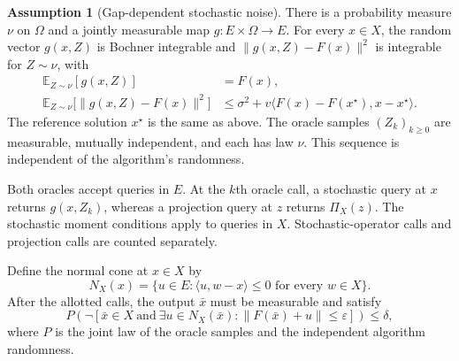 \documentclass[10pt]{article}
\theoremstyle{definition}
\newtheorem{assumption}{Assumption}
\begin{document}
\begin{assumption}[Gap-dependent stochastic noise]
There is a probability measure $\nu$ on $\Omega$ and a jointly measurable map $g:E\times\Omega\to E$. For every $x\in X$, the random vector $g(x,Z)$ is Bochner integrable and $\|g(x,Z)-F(x)\|^2$ is integrable for $Z\sim\nu$, with
\[
\begin{aligned}
\mathbb{E}_{Z\sim\nu}[g(x,Z)]&=F(x),\\
\mathbb{E}_{Z\sim\nu}\bigl[\|g(x,Z)-F(x)\|^2\bigr]
&\leq \sigma^2+v\langle F(x)-F(x^\star),x-x^\star\rangle.
\end{aligned}
\]
The reference solution $x^\star$ is the same as above. The oracle samples $(Z_k)_{k\geq0}$ are measurable, mutually independent, and each has law $\nu$. This sequence is independent of the algorithm's randomness.
\end{assumption}

Both oracles accept queries in $E$. At the $k$th oracle call, a stochastic query at $x$ returns $g(x,Z_k)$, whereas a projection query at $z$ returns $\Pi_X(z)$. The stochastic moment conditions apply to queries in $X$. Stochastic-operator calls and projection calls are counted separately.

Define the normal cone at $x\in X$ by
\[
N_X(x)=\{u\in E:\langle u,w-x\rangle\leq0
\text{ for every }w\in X\}.
\]
After the allotted calls, the output $\bar{x}$ must be measurable and satisfy
\[
P\!\left(\neg\left[\bar{x}\in X\ \text{and}\
\exists u\in N_X(\bar{x}):\|F(\bar{x})+u\|\leq\varepsilon\right]\right)
\leq\delta,
\]
where $P$ is the joint law of the oracle samples and the independent algorithm randomness.
\end{document}
